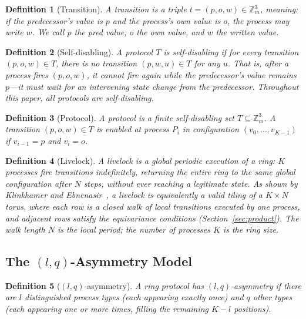 \documentclass[11pt]{article}
\newtheorem{definition}{Definition}
\begin{document}
\begin{definition}[Transition]
A \emph{transition} is a triple $t = (p, o, w) \in \mathbb{Z}_m^3$, meaning: if the predecessor's value is $p$ and the process's own value is $o$, the process may write $w$. We call $p$ the \emph{pred value}, $o$ the \emph{own value}, and $w$ the \emph{written value}.
\end{definition}

\begin{definition}[Self-disabling]
A protocol $T$ is \emph{self-disabling} if for every transition $(p, o, w) \in T$, there is no transition $(p, w, u) \in T$ for any $u$. That is, after a process fires $(p, o, w)$, it cannot fire again while the predecessor's value remains $p$---it must wait for an intervening state change from the predecessor. Throughout this paper, all protocols are self-disabling.
\end{definition}

\begin{definition}[Protocol]
A \emph{protocol} is a finite self-disabling set $T \subseteq \mathbb{Z}_m^3$. A transition $(p, o, w) \in T$ is \emph{enabled} at process $P_i$ in configuration $(v_0, \ldots, v_{K-1})$ if $v_{i-1} = p$ and $v_i = o$.
\end{definition}

\begin{definition}[Livelock]
A \emph{livelock} is a global periodic execution of a ring: $K$ processes fire transitions indefinitely, returning the entire ring to the same global configuration after $N$ steps, without ever reaching a legitimate state. As shown by Klinkhamer and Ebnenasir~\cite{klinkhamer-ebnenasir}, a livelock is equivalently a valid tiling of a $K \times N$ torus, where each row is a closed walk of local transitions executed by one process, and adjacent rows satisfy the equivariance conditions (Section~\ref{sec:product}). The walk length $N$ is the \emph{local period}; the number of processes $K$ is the \emph{ring size}.
\end{definition}

\subsection{The $(l,q)$-Asymmetry Model}

\begin{definition}[$(l,q)$-asymmetry]
A ring protocol has $(l,q)$-asymmetry if there are $l$ \emph{distinguished} process types (each appearing exactly once) and $q$ \emph{other} types (each appearing one or more times, filling the remaining $K - l$ positions).
\end{definition}
\end{document}
